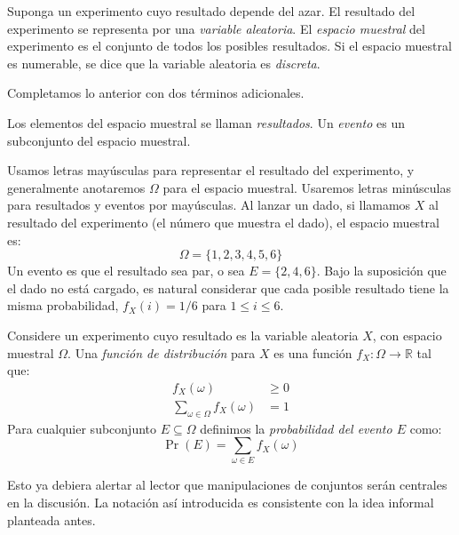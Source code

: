   \begin{definition}
    Suponga un experimento cuyo resultado depende del azar.
    El resultado del experimento se representa por
    una \emph{variable aleatoria}.%
    El \emph{espacio muestral} del experimento%
    es el conjunto de todos los posibles resultados.
    Si el espacio muestral es numerable,
    se dice que la variable aleatoria es \emph{discreta}.
  \end{definition}
  Completamos lo anterior con dos términos adicionales.
  \begin{definition}
    Los elementos del espacio muestral se llaman \emph{resultados}.
    Un \emph{evento} es un subconjunto del espacio muestral.%
  \end{definition}
  Usamos letras mayúsculas
  para representar el resultado del experimento,
  y generalmente anotaremos \(\Omega\) para el espacio muestral.
  Usaremos letras minúsculas para resultados
  y eventos por mayúsculas.
  Al lanzar un dado,
  si llamamos \(X\) al resultado del experimento
  (el número que muestra el dado),
  el espacio muestral es:
  \begin{equation*}
    \Omega
      = \{ 1, 2, 3, 4, 5, 6 \}
  \end{equation*}
  Un evento es que el resultado sea par,
  o sea \(E = \{ 2, 4, 6 \}\).
  Bajo la suposición que el dado no está cargado,
  es natural considerar
  que cada posible resultado tiene la misma probabilidad,
  \(f_X(i) = 1 / 6\) para \(1 \le i \le 6\).
  \begin{definition}
    Considere un experimento
    cuyo resultado es la variable aleatoria \(X\),
    con espacio muestral \(\Omega\).
    Una \emph{función de distribución} para \(X\)%
    es una función \(f_X \colon \Omega \rightarrow \mathbb{R}\)
    tal que:
    \begin{align}
      f_X(\omega)
	&\ge 0
	    \label{eq:f(omega)>=0} \\
      \sum_{\omega \in \Omega} f_X(\omega)
	&= 1
	    \label{eq:sum_f(omega)=1}
    \end{align}
    Para cualquier subconjunto \(E \subseteq \Omega\)
    definimos la \emph{probabilidad del evento \(E\)}%
    como:
    \begin{equation*}
      \Pr(E)
	= \sum_{\omega \in E} f_X(\omega)
    \end{equation*}
  \end{definition}
  Esto ya debiera alertar al lector que manipulaciones de conjuntos
  serán centrales en la discusión.
  La notación así introducida es consistente con la idea informal
  planteada antes.

